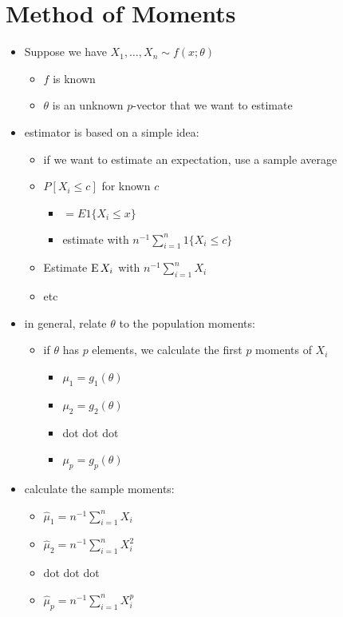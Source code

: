 \section{Method of Moments}

\begin{itemize}
\item Suppose we have $X_1,\dots,X_n \sim f(x; \theta)$
\begin{itemize}
\item $f$ is known
\item $\theta$ is an unknown $p$-vector that we want to estimate
\end{itemize}
\item estimator is based on a simple idea:
\begin{itemize}
\item if we want to estimate an expectation, use a sample average
\item $P[X_i \leq c]$ for known $c$
\begin{itemize}
\item $=E 1\{X_i \leq x\}$
\item estimate with $n^{-1} \sum_{i=1}^n 1\{X_i \leq c\}$
\end{itemize}
\item Estimate $\operatorname{E} X_i$ with $n^{-1} \sum_{i=1}^n X_i$
\item etc
\end{itemize}
\item in general, relate $\theta$ to the population moments:
\begin{itemize}
\item if $\theta$ has $p$ elements, we calculate the first $p$ moments
        of $X_i$
\begin{itemize}
\item $\mu_1 = g_1(\theta)$
\item $\mu_2 = g_2(\theta)$
\item dot dot dot
\item $\mu_p = g_p(\theta)$
\end{itemize}
\end{itemize}
\item calculate the sample moments:
\begin{itemize}
\item $\hat \mu_1 = n^{-1}\sum_{i=1}^n X_i$
\item $\hat \mu_2 = n^{-1}\sum_{i=1}^n X_i^2$
\item dot dot dot
\item $\hat \mu_p = n^{-1}\sum_{i=1}^n X_i^p$

\end{itemize}
\end{itemize}
